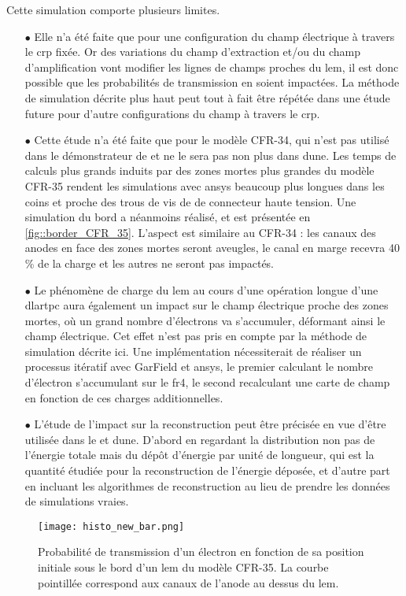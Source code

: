       Cette simulation comporte plusieurs limites.
      \begin{itemize}
        \item[$\bullet$] Elle n'a été faite que pour une configuration du champ électrique à travers le \gls{crp} fixée. Or des variations du champ d'extraction et/ou du champ d'amplification vont modifier les lignes de champs proches du \gls{lem}, il est donc possible que les probabilités de transmission en soient impactées. La méthode de simulation décrite plus haut peut tout à fait être répétée dans une étude future pour d'autre configurations du champ à travers le \gls{crp}.
        \item[$\bullet$] Cette étude n'a été faite que pour le modèle CFR-34, qui n'est pas utilisé dans le démonstrateur de \SSS{} et ne le sera pas non plus dans \gls{dune}. Les temps de calculs plus grands induits par des zones mortes plus grandes du modèle CFR-35 rendent les simulations avec \gls{ansys} beaucoup plus longues dans les coins et proche des trous de vis de de connecteur haute tension. Une simulation du bord a néanmoins réalisé, et est présentée en \autoref{fig::border_CFR_35}. L'aspect est similaire au CFR-34 : les canaux des anodes en face des zones mortes seront aveugles, le canal en marge recevra 40\,\% de la charge et les autres ne seront pas impactés.
        \item[$\bullet$] Le phénomène de charge du \gls{lem} au cours d'une opération longue d'une \gls{dlartpc} aura également un impact sur le champ électrique proche des zones mortes, où un grand nombre d'électrons va s'accumuler, déformant ainsi le champ électrique. Cet effet n'est pas pris en compte par la méthode de simulation décrite ici. Une implémentation nécessiterait de réaliser un processus itératif avec GarField et \gls{ansys}, le premier calculant le nombre d'électron s'accumulant sur le \gls{fr4}, le second recalculant une carte de champ en fonction de ces charges additionnelles.
        \item[$\bullet$] L'étude de l'impact sur la reconstruction peut être précisée en vue d'être utilisée dans le \SSS{} et \gls{dune}. D'abord en regardant la distribution non pas de l'énergie totale mais du dépôt d'énergie par unité de longueur, qui est la quantité étudiée pour la reconstruction de l'énergie déposée, et d'autre part en incluant les algorithmes de reconstruction au lieu de prendre les données de simulations vraies.
      \end{itemize}
      
      \begin{figure}[htpb]
        \centering
        \texttt{[image: histo\_new\_bar.png]}
        \caption[Probabilité de transmission d'un électron en fonction de sa position initiale sous le bord d'un \gls{lem} du modèle CFR-35.]{\label{fig::border_CFR_35}Probabilité de transmission d'un électron en fonction de sa position initiale sous le bord d'un \gls{lem} du modèle CFR-35. La courbe pointillée correspond aux canaux de l'anode au dessus du \gls{lem}.}
      \end{figure}
        
